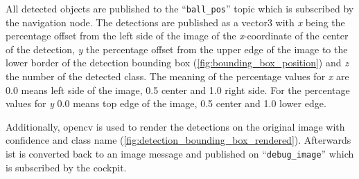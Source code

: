All detected objects are published to the \enquote{\texttt{ball\_pos}} topic which is subscribed by the navigation node. The detections are published as a vector3 with \textit{x} being the percentage offset from the left side of the image of the \textit{x}-coordinate of the center of the detection, \textit{y} the percentage offset from the upper edge of the image to the lower border of the detection bounding box (\autoref{fig:bounding_box_position}) and \textit{z} the number of the detected class. The meaning of the percentage values for \textit{x} are 0.0 means left side of the image, 0.5 center and 1.0 right side. For the percentage values for \textit{y} 0.0 means top edge of the image, 0.5 center and 1.0 lower edge.

Additionally, opencv is used to render the detections on the original image with confidence and class name (\autoref{fig:detection_bounding_box_rendered}). Afterwards ist is converted back to an image message and published on \enquote{\texttt{debug\_image}} which is subscribed by the cockpit.
